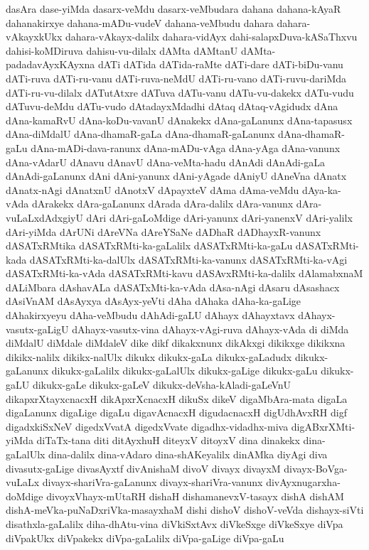 {dasAra
dase-yiMda
dasarx-veMdu
dasarx-veMbudara
dahana
dahana-kAyaR
dahanakirxye
dahana-mADu-vudeV
dahana-veMbudu
dahara
dahara-vAkayxkUkx
dahara-vAkayx-dalilx
dahara-vidAyx
dahi-salapxDuva-kASaThxvu
dahisi-koMDiruva
dahisu-vu-dilalx
dAMta
dAMtanU
dAMta-padadavAyxKAyxna
dATi
dATida
dATida-raMte
dATi-dare
dATi-biDu-vanu
dATi-ruva
dATi-ru-vanu
dATi-ruva-neMdU
dATi-ru-vano
dATi-ruvu-dariMda
dATi-ru-vu-dilalx
dATutAtxre
dATuva
dATu-vanu
dATu-vu-dakekx
dATu-vudu
dATuvu-deMdu
dATu-vudo
dAtadayxMdadhi
dAtaq
dAtaq-vAgidudx
dAna
dAna-kamaRvU
dAna-koDu-vavanU
dAnakekx
dAna-gaLanunx
dAna-tapasusx
dAna-diMdalU
dAna-dhamaR-gaLa
dAna-dhamaR-gaLanunx
dAna-dhamaR-gaLu
dAna-mADi-dava-ranunx
dAna-mADu-vAga
dAna-yAga
dAna-vanunx
dAna-vAdarU
dAnavu
dAnavU
dAna-veMta-hadu
dAnAdi
dAnAdi-gaLa
dAnAdi-gaLanunx
dAni
dAni-yanunx
dAni-yAgade
dAniyU
dAneVna
dAnatx
dAnatx-nAgi
dAnatxnU
dAnotxV
dApayxteV
dAma
dAma-veMdu
dAya-ka-vAda
dArakekx
dAra-gaLanunx
dArada
dAra-dalilx
dAra-vanunx
dAra-vuLaLxdAdxgiyU
dAri
dAri-gaLoMdige
dAri-yanunx
dAri-yanenxV
dAri-yalilx
dAri-yiMda
dArUNi
dAreVNa
dAreYSaNe
dADhaR
dADhayxR-vanunx
dASATxRMtika
dASATxRMti-ka-gaLalilx
dASATxRMti-ka-gaLu
dASATxRMti-kada
dASATxRMti-ka-dalUlx
dASATxRMti-ka-vanunx
dASATxRMti-ka-vAgi
dASATxRMti-ka-vAda
dASATxRMti-kavu
dASAvxRMti-ka-dalilx
dAlamabxnaM
dALiMbara
dAshavALa
dASATxMti-ka-vAda
dAsa-nAgi
dAsaru
dAsashacx
dAsiVnAM
dAsAyxya
dAsAyx-yeVti
dAha
dAhaka
dAha-ka-gaLige
dAhakirxyeyu
dAha-veMbudu
dAhAdi-gaLU
dAhayx
dAhayxtavx
dAhayx-vasutx-gaLigU
dAhayx-vasutx-vina
dAhayx-vAgi-ruva
dAhayx-vAda
di
diMda
diMdalU
diMdale
diMdaleV
dike
dikf
dikakxnunx
dikAkxgi
dikikxge
dikikxna
dikikx-nalilx
dikikx-nalUlx
dikukx
dikukx-gaLa
dikukx-gaLadudx
dikukx-gaLanunx
dikukx-gaLalilx
dikukx-gaLalUlx
dikukx-gaLige
dikukx-gaLu
dikukx-gaLU
dikukx-gaLe
dikukx-gaLeV
dikukx-deVsha-kAladi-gaLeVnU
dikapxrXtayxcnacxH
dikApxrXcnacxH
dikuSx
dikeV
digaMbAra-mata
digaLa
digaLanunx
digaLige
digaLu
digavAcnacxH
digudacnacxH
digUdhAvxRH
digf
digadxkiSxNeV
digedxVvatA
digedxVvate
digadhx-vidadhx-miva
digABxrXMti-yiMda
diTaTx-tana
diti
ditAyxhuH
diteyxV
ditoyxV
dina
dinakekx
dina-gaLalUlx
dina-dalilx
dina-vAdaro
dina-shAKeyalilx
dinAMka
diyAgi
diva
divasutx-gaLige
divasAyxtf
divAnishaM
divoV
divayx
divayxM
divayx-BoVga-vuLaLx
divayx-shariVra-gaLanunx
divayx-shariVra-vanunx
divAyxnugarxha-doMdige
divoyxVhayx-mUtaRH
dishaH
dishamanevxV-tasayx
dishA
dishAM
dishA-meVka-puNaDxriVka-masayxhaM
dishi
dishoV
dishoV-veVda
dishayx-siVti
disathxla-gaLalilx
diha-dhAtu-vina
diVkiSxtAvx
diVkeSxge
diVkeSxye
diVpa
diVpakUkx
diVpakekx
diVpa-gaLalilx
diVpa-gaLige
diVpa-gaLu
}
